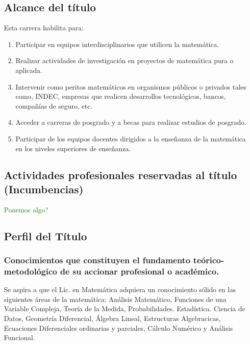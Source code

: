\documentclass[a4paper, 12pt]{article}
\begin{document}
\subsection{Alcance del título} Esta carrera habilita para:
    \begin{enumerate}

        \item Participar en equipos interdisciplinarios que utilicen la matemática.
        
        \item  Realizar actividades de investigación en proyectos de matemática         pura o aplicada.
       
       \item Intervenir  como peritos matemáticos en  organismos públicos o privados  tales como, INDEC,  empresas que realicen desarrollos tecnológicos, bancos,   compañías de seguro, etc.
       
        \item Acceder a carreras de posgrado y a becas para realizar estudios de posgrado.
       
       \item Participar de los equipos docentes dirigidos a la
         enseñanza de la matemática en los niveles superiores de enseñanza.
    
       
         
    \end{enumerate}

\subsection{Actividades profesionales reservadas al título (Incumbencias)}

\textcolor{green}{Ponemos algo?}
    
\subsection{Perfil del Título}
 


\subsubsection{Conocimientos que constituyen el fundamento teórico-metodológico de su accionar profesional o académico.}

Se aspira a que el Lic. en Matemática adquiera un conocimiento sólido en las siguientes  áreas de
 la matemática: Análisis Matemático, Funciones de una Variable Compleja,   Teoría de la Medida, Probabilidades. Estadística. Ciencia de Datos, Geometría Diferencial, Álgebra Lineal, Estructuras Algebracicas, Ecuaciones Diferenciales ordinarias y parciales, Cálculo Numérico y Análisis Funcional.
 
\end{document}
